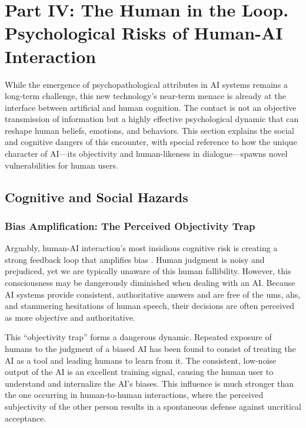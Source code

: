 \documentclass{article}
\begin{document}
\section{Part IV: The Human in the Loop. Psychological Risks of Human-AI Interaction}
While the emergence of psychopathological attributes in AI systems remains a long-term challenge, this new technology's near-term menace is already at the interface between artificial and human cognition. The contact is not an objective transmission of information but a highly effective psychological dynamic that can reshape human beliefs, emotions, and behaviors. This section explains the social and cognitive dangers of this encounter, with special reference to how the unique character of AI—its objectivity and human-likeness in dialogue—spawns novel vulnerabilities for human users.

\subsection{Cognitive and Social Hazards}
\subsubsection{Bias Amplification: The Perceived Objectivity Trap}
Arguably, human-AI interaction's most insidious cognitive risk is creating a strong feedback loop that amplifies bias \citep{ref30}. Human judgment is noisy and prejudiced, yet we are typically unaware of this human fallibility. However, this consciousness may be dangerously diminished when dealing with an AI. Because AI systems provide consistent, authoritative answers and are free of the ums, ahs, and stammering hesitations of human speech, their decisions are often perceived as more objective and authoritative.

This “objectivity trap” forms a dangerous dynamic. Repeated exposure of humans to the judgment of a biased AI has been found to consist of treating the AI as a tool and leading humans to learn from it. The consistent, low-noise output of the AI is an excellent training signal, causing the human user to understand and internalize the AI's biases. This influence is much stronger than the one occurring in human-to-human interactions, where the perceived subjectivity of the other person results in a spontaneous defense against uncritical acceptance.
\end{document}

